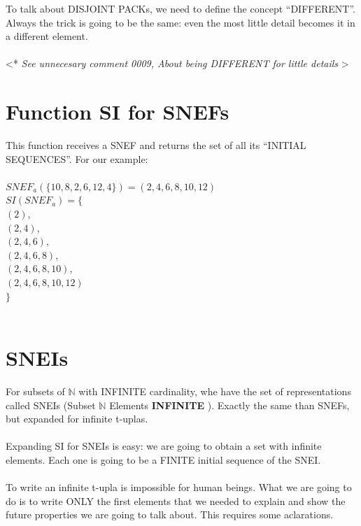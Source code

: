 		\noindent
		To talk about DISJOINT PACKs, we need to define the concept ``DIFFERENT''. Always the trick is going to be the same: even the most little detail becomes it in a different element.
		\\\\
		
		\noindent
		\textless ** \textit{See unnecesary comment 0009, About being DIFFERENT for  little details} \textgreater
		
	\section{Function SI for SNEFs}
	
		\noindent
		This function receives a SNEF and returns the set of all its ``INITIAL SEQUENCES''. For our example:\\\\
		$SNEF_{a}(\{10, 8, 2, 6, 12, 4\})= (2,4,6,8,10,12)$\\
		$ SI ( SNEF_{a} ) = \{$\\
		$(2)$,\\
		$(2,4)$,\\
		$(2,4,6)$,\\
		$(2,4,6,8)$,\\
		$(2,4,6,8,10)$,\\
		$(2,4,6,8,10,12)$\\
		$\}$
		\\\\
		
	\section{SNEIs}
	
		\noindent
		For subsets of $\mathbb{N}$ with INFINITE cardinality, whe have the set of representations called SNEIs (Subset $\mathbb{N}$ Elements \textbf{INFINITE} ). Exactly the same than SNEFs, but expanded for infinite t-uplas.
		\\\\
		
		\noindent
		Expanding SI for SNEIs is easy: we are going to obtain a set with infinite elements. Each one is going to be a FINITE initial sequence of the SNEI.
		\\\\
		
		\noindent
		To write an infinite t-upla is impossible for human beings. What we are going to do is to write ONLY the first elements that we needed to explain and show the future properties we are going to talk about. This requires some aclarations.
		\\\\
		

